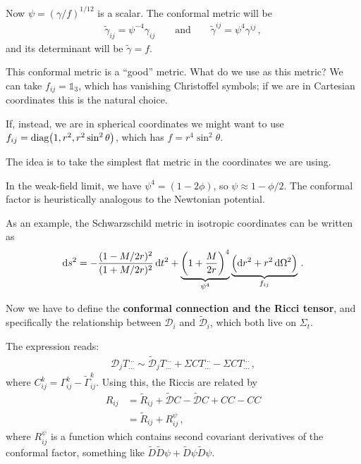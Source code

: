 \documentclass[main.tex]{subfiles}
\begin{document}
Now \(\psi = (\gamma / f)^{1/12}\) is a scalar. The conformal metric will be 
%
\begin{align}
\widetilde{\gamma}_{ij} = \psi^{-4} \gamma_{ij} 
\qquad \text{and} \qquad
\widetilde{\gamma}^{ij} = \psi^{4} \gamma^{ij} 
\,,
\end{align}
%
and its determinant will be \(\widetilde{\gamma} = f\). 

This conformal metric is a ``good'' metric. 
What do we use as this metric?
We can take \(f_{ij} = \mathbb{1}_3\), which has vanishing Christoffel symbols; if we are in Cartesian coordinates this is the natural choice.

If, instead, we are in spherical coordinates we might want to use \(f_{ij} = \text{diag}\qty(1, r^2, r^2 \sin^2\theta )\), which has \(f = r^{4} \sin^2 \theta \). 

The idea is to take the simplest flat metric in the coordinates we are using. 

In the weak-field limit, we have \(\psi^{4} = (1-2 \phi )\), so \(\psi \approx 1 - \phi /2\). 
The conformal factor is heuristically analogous to the Newtonian potential. 

As an example, the Schwarzschild metric in isotropic coordinates can be written as 
%
\begin{align}
\dd{s^2} = - \frac{(1 - M / 2r)^2}{(1 + M / 2r)^2} \dd{t^2}
+ \underbrace{\qty(1 + \frac{M}{2r})^{4}}_{\psi^{4}} \underbrace{\qty(\dd{r^2} + r^2 \dd{\Omega^2})}_{f_{ij}}
\,.
\end{align}

Now we have to define the \textbf{conformal connection and the Ricci tensor}, and specifically the relationship between \(\mathcal{D}_i\) and \(\widetilde{\mathcal{D}}_i\), which both live on \(\Sigma _t\). 

The expression reads: 
%
\begin{align}
\mathcal{D}_j T_{\dots}^{\dots} \sim \widetilde{\mathcal{D}}_j T_{\dots}^{\dots} + \Sigma C T_{\dots}^{\dots} - \Sigma C T_{\dots}^{\dots}
\,,
\end{align}
%
where \(C^{k}_{ij} = \Gamma^{k}_{ij} - \widetilde{\Gamma}^{k}_{ij}\). 
Using this, the Riccis are related by 
%
\begin{align}
R_{ij} &= \widetilde{R}_{ij} + \mathcal{\widetilde{D}}C - \widetilde{\mathcal{D}} C + CC - CC  \\
&= \widetilde{R}_{ij} + R^{\psi }_{ij}
\,,
\end{align}
%
where \(R^{\psi }_{ij}\) is a function which contains second covariant derivatives of the conformal factor, something like \(\widetilde{D} \widetilde{D} \psi + \widetilde{D} \psi \widetilde{D} \psi \). 
\end{document}

